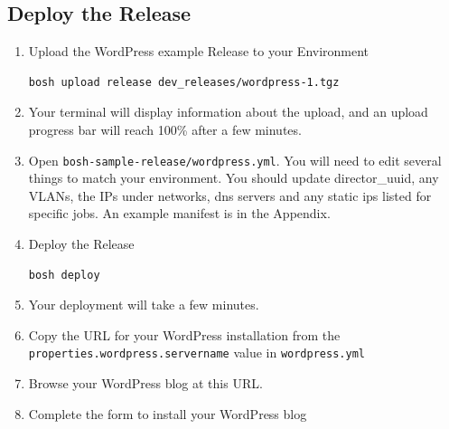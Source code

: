 \subsection{Deploy the Release}
\label{deploytherelease}

\begin{enumerate}
\item Upload the WordPress example Release to your Environment

\begin{verbatim}
bosh upload release dev_releases/wordpress-1.tgz
\end{verbatim}


\item Your terminal will display information about the upload, and an upload progress bar will reach 100\% after a few minutes.

\item Open \texttt{bosh-sample-release\slash wordpress.yml}. You will need to edit several things to match your environment. You should update director\_uuid, any VLANs, the IPs under networks, dns servers and any static ips listed for specific jobs. An example manifest is in the Appendix.

\item Deploy the Release

\begin{verbatim}
bosh deploy
\end{verbatim}


\item Your deployment will take a few minutes.

\item Copy the URL for your WordPress installation from the \texttt{properties.wordpress.servername} value in \texttt{wordpress.yml}

\item Browse your WordPress blog at this URL.

\item Complete the form to install your WordPress blog

\end{enumerate}

